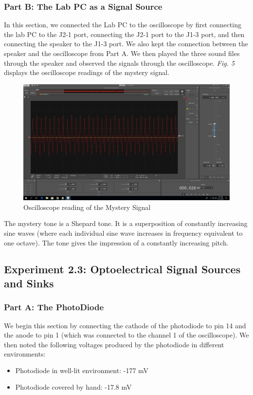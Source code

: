 \documentclass[10pt]{article}
\begin{document}
\subsubsection{Part B: The Lab PC as a Signal Source}
In this section, we connected the Lab PC to the oscilloscope by first connecting the lab PC to the J2-1 port, connecting the J2-1 port to the J1-3 port, and then connecting the speaker to the J1-3 port. We also kept the connection between the speaker and the oscilloscope from Part A. We then played the three sound files through the speaker and observed the signals through the oscilloscope. \textit{Fig. 5} displays the oscilloscope readings of the mystery signal. 
\begin{center}
	\begin{figure} [H]
		\centering
		\includegraphics[scale=0.22]{images/mystery.png}
		\caption{Oscilloscope reading of the Mystery Signal}
	\end{figure}
\end{center}

The mystery tone is a Shepard tone. It is a superposition of constantly increasing sine waves (where each individual sine wave increases in frequency equivalent to one octave). The tone gives the impression of a constantly increasing pitch. 


\subsection{Experiment 2.3: Optoelectrical Signal Sources and Sinks}
\subsubsection{Part A: The PhotoDiode}
We begin this section by connecting the cathode of the photodiode to pin 14 and the anode to pin 1 (which was connected to the channel 1 of the oscilloscope). We then noted the following voltages produced by the photodiode in different environments:
\begin{itemize}
	\item Photodiode in well-lit environment: -177 mV
	\item Photodiode covered by hand: -17.8 mV
\end{itemize}
\end{document}

